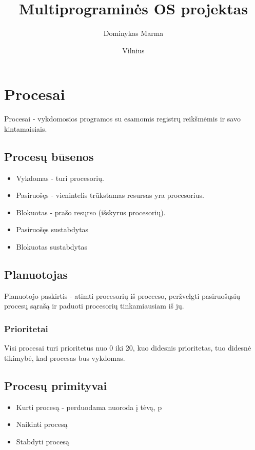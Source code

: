 \documentclass{VUMIFInfKursinis}
\institute{Informatikos institutas}  %
\title{Multiprograminės OS projektas}
\author{Dominykas Marma}
\date{Vilnius \\ \the\year}
\begin{document}
\maketitle

\tableofcontents

\section{Procesai}

Procesai - vykdomosios programos su esamomis registrų reikšmėmis ir savo kintamaisiais.

\subsection{Procesų būsenos}

\begin{itemize}
	\item Vykdomas - turi procesorių.
	\item Pasiruošęs - vienintelis trūkstamas resursas yra procesorius.
	\item Blokuotas - prašo resųrso (išskyrus procesorių).
	\item Pasiruošęs sustabdytas
	\item Blokuotas sustabdytas
\end{itemize}

\subsection{Planuotojas}

Planuotojo paskirtis - atimti procesorių iš procceso, peržvelgti pasiruošųsių procesų sąrašą ir paduoti procesorių tinkamiausiam iš jų.

\subsubsection{Prioritetai}

Visi procesai turi prioritetus nuo 0 iki 20, kuo didesnis prioritetas, tuo didesnė tikimybė, kad procesas bus vykdomas.

\subsection{Procesų primityvai}

\begin{itemize}
	\item Kurti procesą - perduodama nuoroda į tėvą, p
	\item Naikinti procesą
	\item Stabdyti procesą
\end{itemize}
\end{document}
